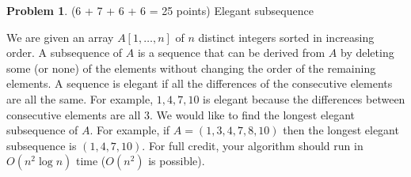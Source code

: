 \documentclass[11pt]{article}
\theoremstyle{definition}
\theoremstyle{theorem}
\newtheorem{prob}{Problem}
\begin{document}
\begin{prob}{(6 + 7 + 6 + 6 = 25 points) Elegant subsequence}\end{prob}
We are given an array $A[1,\ldots, n]$ of $n$ distinct integers sorted in increasing order. A subsequence of $A$ is a sequence that can be derived from $A$ by deleting some (or none) of the elements without changing the order of the remaining elements. A sequence is elegant if all the differences of the consecutive elements are all the same. For example, $1,4,7,10$ is elegant because the differences between consecutive elements are all $3$. We would like to find the longest elegant subsequence of $A$. For example, if $A = (1,3,4,7,8,10)$ then the longest elegant subsequence is $(1,4,7,10)$. For full credit, your algorithm should run in $O(n^2 \log n)$ time ($O(n^2)$ is possible).
\end{document}
